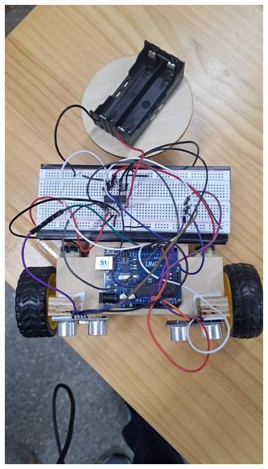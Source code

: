 \documentclass[a4paper,12pt]{./article}
\begin{document}
\begin{center}
\begin{figure}[H]
\begin{minipage}[t]{./0.45\textwidth}
\includegraphics[width=\textwidth]{./photos/d.jpg}
\end{minipage}
\hfill
\end{figure}\FloatBarrier\end{center}
\end{document}
